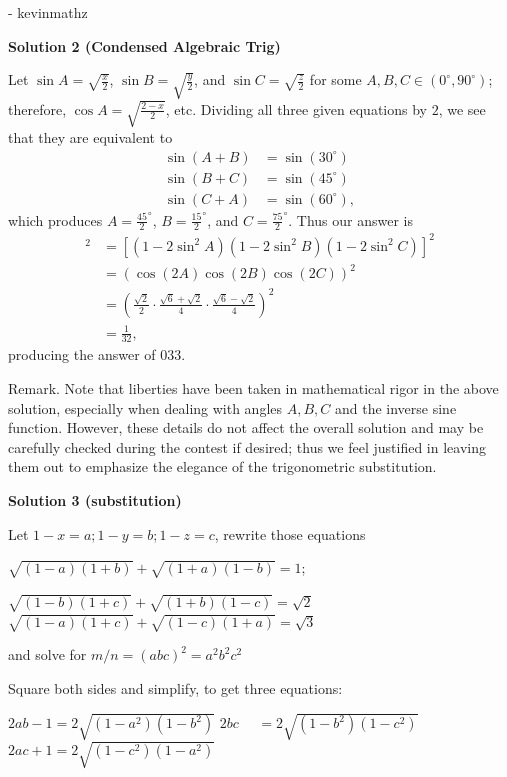 \begin{enumerate}
 - kevinmathz

 



\textbf{Solution 2 (Condensed Algebraic Trig)}

Let $\sin{A} = \sqrt{\frac{x}{2}}$, $\sin{B} = \sqrt{\frac{y}{2}}$, and $\sin{C} = \sqrt{\frac{z}{2}}$ for some $A,B,C \in (0^\circ,90^\circ)$; therefore, $\cos{A} = \sqrt{\frac{2-x}{2}}$, etc. Dividing all three given equations by $2$, we see that they are equivalent to\begin{align*}\sin(A+B) &= \sin(30^\circ) \\\sin(B+C) &= \sin(45^\circ) \\\sin(C+A) &= \sin(60^\circ),\end{align*}
which produces $A=\frac{45}{2}^\circ$, $B=\frac{15}{2}^\circ$, and $C=\frac{75}{2}^\circ$. Thus our answer is\begin{align*}[(1-x)(1-y)(1-z)]^2 &= [(1-2\sin^2 A)(1-2\sin^2 B)(1-2\sin^2 C)]^2 \\&= (\cos(2A)\cos(2B)\cos(2C))^2 \\&= \left(\frac{\sqrt{2}}{2} \cdot \frac{\sqrt{6}+\sqrt{2}}{4} \cdot \frac{\sqrt{6}-\sqrt{2}}{4}\right)^2 \\&= \frac{1}{32},\end{align*}
producing the answer of $\boxed{033}$.

 Remark. Note that liberties have been taken in mathematical rigor in the above solution, especially when dealing with angles $A,B,C$ and the inverse sine function. However, these details do not affect the overall solution and may be carefully checked during the contest if desired; thus we feel justified in leaving them out to emphasize the elegance of the trigonometric substitution.

 



\textbf{Solution 3 (substitution)}

Let $1-x=a;1-y=b;1-z=c$, rewrite those equations

 $\sqrt{(1-a)(1+b)}+\sqrt{(1+a)(1-b)}=1$;

 $\sqrt{(1-b)(1+c)}+\sqrt{(1+b)(1-c)}=\sqrt{2}$
$\sqrt{(1-a)(1+c)}+\sqrt{(1-c)(1+a)}=\sqrt{3}$

 and solve for $m/n = (abc)^2 = a^2b^2c^2$

 Square both sides and simplify, to get three equations:

 $2ab-1=2\sqrt{(1-a^2)(1-b^2)}$
$2bc~ ~ ~ ~  ~ ~=2\sqrt{(1-b^2)(1-c^2)}$
$2ac+1=2\sqrt{(1-c^2)(1-a^2)}$


\end{enumerate}
